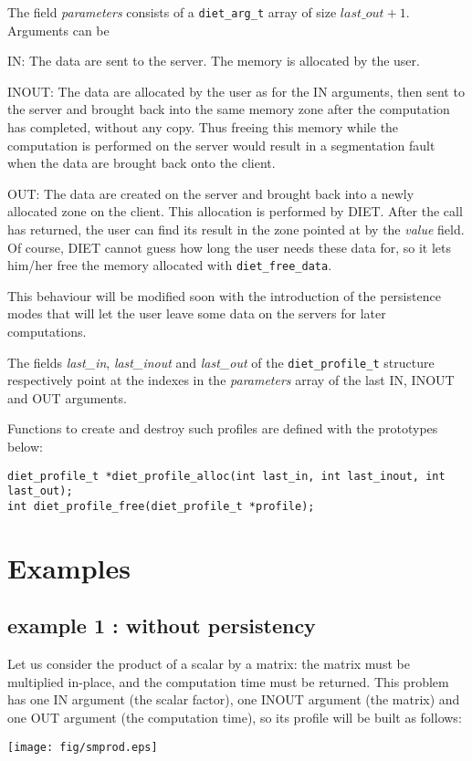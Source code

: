 The field \emph{parameters} consists of a \texttt{diet\_arg\_t} array of size
$last\_out + 1$. Arguments can be
\begin{description}
\item{IN:}    The data are sent to the server. The memory is allocated
  by the user.
\item{INOUT:} The data are allocated by the user as for the IN
  arguments, then sent to the server and brought back into the same memory zone
  after the computation has completed, without any copy. Thus freeing this
  memory while the computation is performed on the server would result in a
  segmentation fault when the data are brought back onto the client.
\item{OUT:} The data are created on the server and brought back into a
  newly allocated zone on the client. This allocation is performed by
  DIET. After the call has returned, the user can find its result in
  the zone pointed at by the \emph{value} field. Of course, DIET
  cannot guess how long the user needs these data for, so it lets
  him/her free the memory allocated with \texttt{diet\_free\_data}.
\end{description}

This behaviour will be modified soon with the introduction of the persistence
modes that will let the user leave some data on the servers for later
computations.

The fields \emph{last\_in}, \emph{last\_inout} and \emph{last\_out} of the
\texttt{diet\_profile\_t} structure respectively point at the indexes in the
\emph{parameters} array of the last IN, INOUT and OUT arguments.

Functions to create and destroy such profiles are defined with the prototypes
below:
{\footnotesize
\begin{verbatim}
diet_profile_t *diet_profile_alloc(int last_in, int last_inout, int last_out);
int diet_profile_free(diet_profile_t *profile);
\end{verbatim}
}



\section{Examples}
\label{sec:pbex}

\subsection{example 1 : without persistency}
Let us consider the product of a scalar by a matrix: the matrix must be
multiplied in-place, and the computation time must be returned.  This
problem has one IN argument (the scalar factor), one INOUT argument (the matrix)
and one OUT argument (the computation time), so its profile will be built as
follows:
\begin{center}
\texttt{[image: fig/smprod.eps]}
\end{center}

